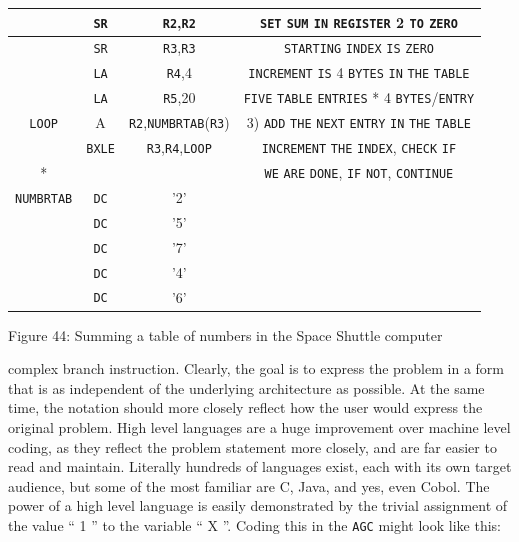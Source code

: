 \documentclass[refcap, oxford]{ahsan}
\begin{document}
\begin{center}
\begin{tabular}{|c|c|c|c|}
\hline
 & \texttt{SR} & \texttt{R2},\texttt{R2} & \texttt{SET} \texttt{SUM} \texttt{IN} \texttt{REGISTER} 2 \texttt{TO} \texttt{ZERO} \\
\hline
 & \texttt{SR} & \texttt{R3},\texttt{R3} & \texttt{STARTING} \texttt{INDEX} \texttt{IS} \texttt{ZERO} \\
\hline
 & \texttt{LA} & \texttt{R4},4 & \texttt{INCREMENT} \texttt{IS} 4 \texttt{BYTES} \texttt{IN} \texttt{THE} \texttt{TABLE} \\
\hline
 & \texttt{LA} & \texttt{R5},20 & \texttt{FIVE} \texttt{TABLE} \texttt{ENTRIES} * 4 \texttt{BYTES}/\texttt{ENTRY} \\
\hline
\texttt{LOOP} & A & \texttt{R2},\texttt{NUMBRTAB}(\texttt{R3}) & 3) \texttt{ADD} \texttt{THE} \texttt{NEXT} \texttt{ENTRY} \texttt{IN} \texttt{THE} \texttt{TABLE} \\
\hline
 & \texttt{BXLE} & \texttt{R3},\texttt{R4},\texttt{LOOP} & \texttt{INCREMENT} \texttt{THE} \texttt{INDEX}, \texttt{CHECK} \texttt{IF} \\
\hline
* &  &  & \texttt{WE} \texttt{ARE} \texttt{DONE}, \texttt{IF} \texttt{NOT}, \texttt{CONTINUE} \\
\hline
\texttt{NUMBRTAB} & \texttt{DC} & '2' &  \\
\hline
 & \texttt{DC} & '5' &  \\
\hline
 & \texttt{DC} & '7' &  \\
\hline
 & \texttt{DC} & '4' &  \\
\hline
 & \texttt{DC} & '6' &  \\
\hline
\end{tabular}
\end{center}

Figure 44: Summing a table of numbers in the Space Shuttle computer


complex branch instruction. Clearly, the goal is to express the problem in a form that is as independent of the underlying architecture as possible. At the same time, the notation should more closely reflect how the user would express the original problem. High level languages are a huge improvement over machine level coding, as they reflect the problem statement more closely, and are far easier to read and maintain. Literally hundreds of languages exist, each with its own target audience, but some of the most familiar are C, Java, and yes, even Cobol. The power of a high level language is easily demonstrated by the trivial assignment of the value `` 1 '' to the variable `` X ''. Coding this in the \texttt{AGC} might look like this:
\end{document}
